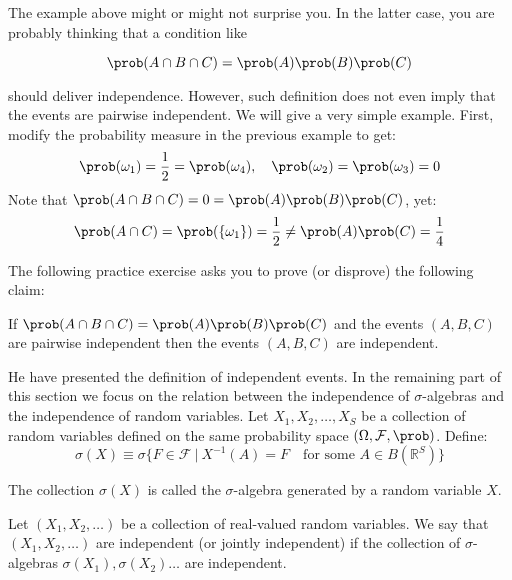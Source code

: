 \documentclass[11pt]{article} %
\begin{document}
The example above might or might not surprise you. In the latter case, you are probably thinking that a condition like

$$\prob(A \cap B \cap C)=\prob(A) \prob(B) \prob(C)$$

\noindent should deliver independence. However, such definition does not even imply that the events are pairwise independent. We will give a very simple example. First, modify the probability measure in the previous example to get:
\begin{equation*}
\prob(\omega_1)= \frac{1}{2}=\prob(\omega_4), \quad \prob(\omega_2)=\prob(\omega_3)=0
\end{equation*}
Note that $\prob(A \cap B \cap C)=0=\prob(A)\prob(B)\prob(C)$, yet:
\begin{equation*}
	\prob(A \cap C)= \prob(\{\omega_1\}) = \frac{1}{2} \neq \prob(A)\prob(C)= \frac{1}{4}
\end{equation*}

\noindent The following practice exercise asks you to prove (or disprove) the following claim:\\

 \begin{prproblem}
 If $\prob(A \cap B \cap C)=\prob(A)\prob(B)\prob(C)$ and the events $(A, B, C)$ are pairwise independent then the events $(A, B, C)$ are independent. 
\end{prproblem}

He have presented the definition of independent events. In the remaining part of this section we focus on the relation between the independence of $\sigma$-algebras and the independence of random variables. Let $X_1, X_2, \ldots ,X_S$ be a collection of random variables defined on the same probability space $(\Omega, \mathcal{F}, \prob)$. Define:
$$ \sigma(X) \equiv \sigma \{F \in \mathcal{F} \: | \: X^{-1}(A) = F \quad \text{for some } A \in B(\mathbb{R}^{S}) \} $$

\noindent The collection $\sigma(X)$ is called the $\sigma$-algebra generated by a random variable $X$. 

\begin{definition}  Let $(X_1, X_2, \ldots)$ be a collection of real-valued random variables. We say that $(X_1, X_2, \ldots)$ are independent (or jointly independent) if the collection of $\sigma$-algebras $\sigma(X_1), \sigma(X_2) \ldots $ are independent. 
\end{definition}

\end{document}
